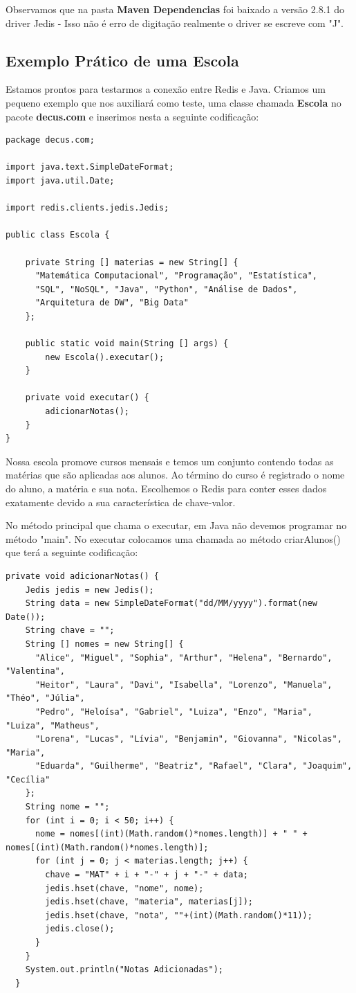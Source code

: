 Observamos que na pasta \textbf{Maven Dependencias} foi baixado a versão 2.8.1 do driver Jedis - Isso não é erro de digitação realmente o driver se escreve com "J".

\subsection{Exemplo Prático de uma Escola}
Estamos prontos para testarmos a conexão entre Redis e Java. Criamos um pequeno exemplo que nos auxiliará como teste, uma classe chamada \textbf{Escola} no pacote \textbf{decus.com} e inserimos nesta a seguinte codificação:
\begin{lstlisting}[]
package decus.com;

import java.text.SimpleDateFormat;
import java.util.Date;

import redis.clients.jedis.Jedis;

public class Escola {
	
	private String [] materias = new String[] {
	  "Matemática Computacional", "Programação", "Estatística",
  	  "SQL", "NoSQL", "Java", "Python", "Análise de Dados",
	  "Arquitetura de DW", "Big Data"
    };

	public static void main(String [] args) {
		new Escola().executar();
	}
	
	private void executar() {
		adicionarNotas();
	}
}
\end{lstlisting}

Nossa escola promove cursos mensais e temos um conjunto contendo todas as matérias que são aplicadas aos alunos. Ao término do curso é registrado o nome do aluno, a matéria e sua nota. Escolhemos o Redis para conter esses dados exatamente devido a sua característica de chave-valor.

No método principal que chama o executar, em Java não devemos programar no método "main". No executar colocamos uma chamada ao método criarAlunos() que terá a seguinte codificação:
\begin{lstlisting}[]
  private void adicionarNotas() {
	Jedis jedis = new Jedis();
	String data = new SimpleDateFormat("dd/MM/yyyy").format(new Date());
	String chave = "";
	String [] nomes = new String[] {
	  "Alice", "Miguel", "Sophia", "Arthur", "Helena", "Bernardo", "Valentina", 
	  "Heitor", "Laura", "Davi", "Isabella", "Lorenzo", "Manuela", "Théo", "Júlia", 
	  "Pedro", "Heloísa", "Gabriel", "Luiza", "Enzo", "Maria", "Luiza", "Matheus", 
	  "Lorena", "Lucas", "Lívia", "Benjamin", "Giovanna", "Nicolas", "Maria", 
	  "Eduarda", "Guilherme", "Beatriz", "Rafael", "Clara", "Joaquim", "Cecília"
	};
	String nome = "";
	for (int i = 0; i < 50; i++) {
	  nome = nomes[(int)(Math.random()*nomes.length)] + " " + nomes[(int)(Math.random()*nomes.length)];
  	  for (int j = 0; j < materias.length; j++) {
	    chave = "MAT" + i + "-" + j + "-" + data;
		jedis.hset(chave, "nome", nome);
		jedis.hset(chave, "materia", materias[j]);
		jedis.hset(chave, "nota", ""+(int)(Math.random()*11));
		jedis.close();
	  }
	}
	System.out.println("Notas Adicionadas");
  }
\end{lstlisting}

